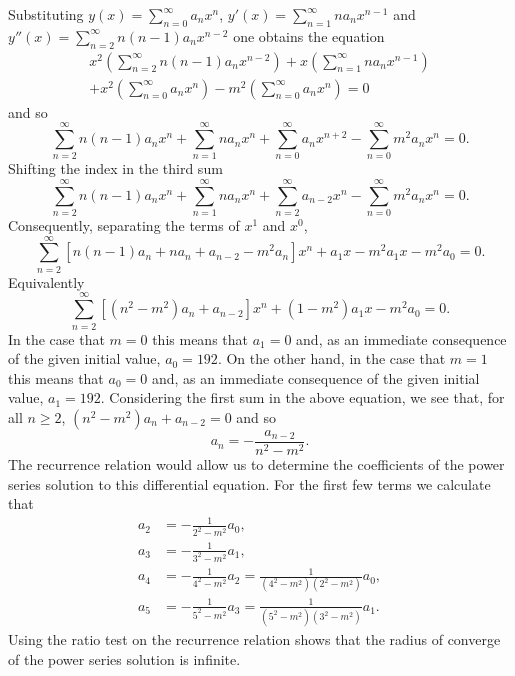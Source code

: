 \begin{solution}
    Substituting $y(x) = \sum_{n=0}^{\infty} a_n x^n$, $y'(x) = \sum_{n=1}^{\infty} n a_n x^{n-1}$ and $y''(x) = \sum_{n=2}^{\infty} n(n-1) a_n x^{n-2}$ one obtains the equation
    \begin{multline*}
                x^2 \left(\sum_{n=2}^{\infty} n(n-1) a_n x^{n-2}\right) + x \left(\sum_{n=1}^{\infty} n a_n x^{n-1}\right) \\ + x^2 \left(\sum_{n=0}^{\infty} a_n x^n\right) - m^2 \left(\sum_{n=0}^{\infty} a_n x^n\right) = 0
            \end{multline*}
    and so
    $$
        \sum_{n=2}^{\infty} n(n-1) a_n x^{n} + \sum_{n=1}^{\infty} n a_n x^{n} + \sum_{n=0}^{\infty} a_n x^{n+2} -  \sum_{n=0}^{\infty} m^2 a_n x^n = 0.
    $$
    Shifting the index in the third sum
    $$
        \sum_{n=2}^{\infty} n(n-1) a_n x^{n} + \sum_{n=1}^{\infty} n a_n x^{n} + \sum_{n=2}^{\infty} a_{n-2} x^{n} -  \sum_{n=0}^{\infty} m^2 a_n x^n = 0.
    $$
    Consequently, separating the terms of \(x^1\) and \(x^0\),
    $$
        \sum_{n=2}^{\infty}  \left[ n(n-1)a_n + n a_n +  a_{n-2} -m^2a_n  \right] x^{n} + a_1 x - m^2 a_1 x - m^2 a_0  =0.
    $$
    Equivalently
    $$
        \sum_{n=2}^{\infty}  \left[ (n^2 - m^2)a_n +  a_{n-2}   \right] x^{n} + (1 - m^2 )a_1 x - m^2 a_0  =0.
    $$
    In the case that $m=0$ this means that $a_1 = 0$ and, as an immediate consequence of the given initial value, $a_0 = 192$.
    On the other hand, in the case that $m=1$ this means that $a_0=0$ and, as an immediate consequence of the given initial value, $a_1 = 192$.
    Considering the first sum in the above equation, we see that, for all $n\geq 2$,  $ (n^2 - m^2)a_n +  a_{n-2}  = 0 $ and so
    $$
        a_n = - \frac{a_{n-2}}{n^2 - m^2}.
    $$
    The recurrence relation would allow us to determine the coefficients of the power series solution to this differential equation.
    For the first few terms we calculate that
    $$
        \begin{aligned}
            a_2 & =  - \frac{1}{2^2 - m^2}a_{0},                                          \\
            a_3 & =  - \frac{1}{3^2 - m^2}a_{1},                                          \\
            a_4 & =  - \frac{1}{4^2 - m^2}a_{2} = \frac{1}{(4^2 - m^2)(2^2 - m^2)} a_{0}, \\
            a_5 & =  - \frac{1}{5^2 - m^2}a_{3} = \frac{1}{(5^2 - m^2)(3^2 - m^2)}a_{1}.
        \end{aligned}
    $$
    Using the ratio test on the recurrence relation shows that the radius of converge of the power series solution is infinite.
\end{solution}





